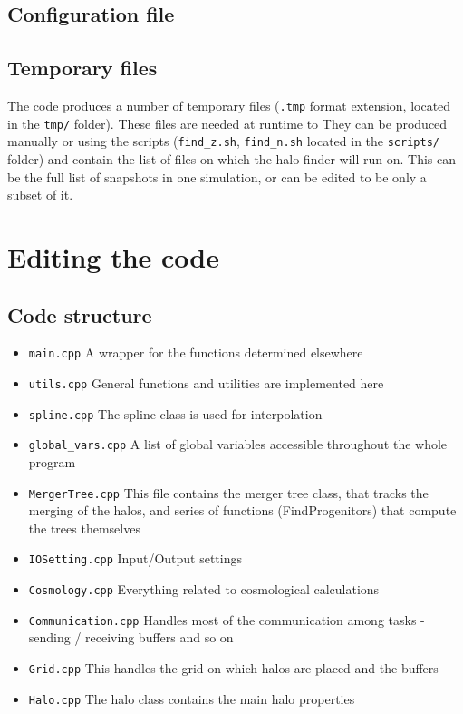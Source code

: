 \documentclass{article}
\begin{document}
\subsection{Configuration file}
\subsection{Temporary files}

The code produces a number of temporary files (\texttt{.tmp} format extension, located in the \texttt{tmp/} folder).
These files are needed at runtime to 
They can be produced manually or using the scripts (\texttt{find\_z.sh}, \texttt{find\_n.sh} located in the \texttt{scripts/} folder)
and contain the list of files on which the halo finder will run on.
This can be the full list of snapshots in one simulation, or can be edited to be only a subset of it.

\section{Editing the code}
\subsection{Code structure}

\begin{itemize}
\item{\texttt{main.cpp}} A wrapper for the functions determined elsewhere
\item{\texttt{utils.cpp}} General functions and utilities are implemented here
\item{\texttt{spline.cpp}} The spline class is used for interpolation 
\item{\texttt{global\_vars.cpp}} A list of global variables accessible throughout the whole program
\item{\texttt{MergerTree.cpp}} This file contains the merger tree class, that tracks the merging of the halos, and series of functions (FindProgenitors) that compute the trees themselves
\item{\texttt{IOSetting.cpp}} Input/Output settings
\item{\texttt{Cosmology.cpp}} Everything related to cosmological calculations
\item{\texttt{Communication.cpp}} Handles most of the communication among tasks - sending / receiving buffers and so on
\item{\texttt{Grid.cpp}} This handles the grid on which halos are placed and the buffers
\item{\texttt{Halo.cpp}} The halo class contains the main halo properties
\end{itemize}
\end{document}
